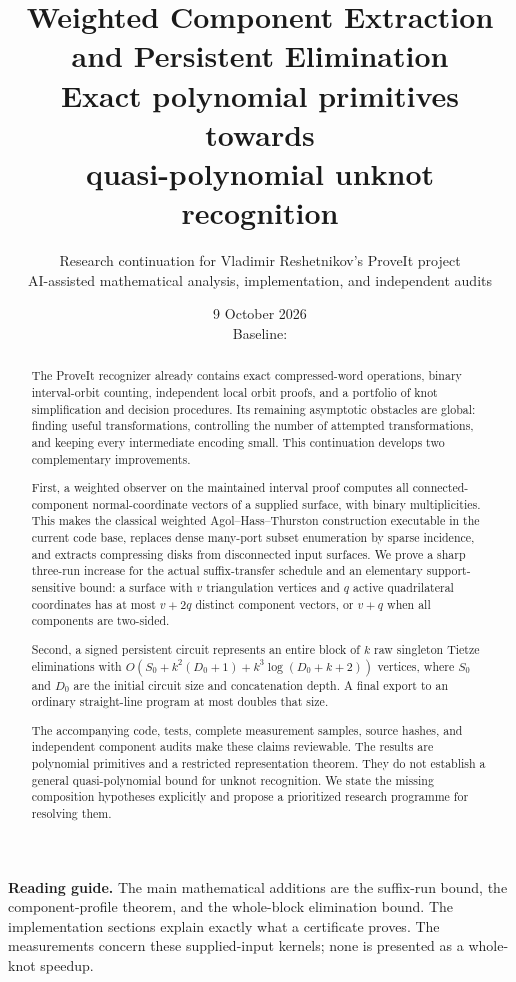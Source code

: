 \documentclass[11pt,a4paper]{article}
\title{\textbf{Weighted Component Extraction\\and Persistent Elimination}\\[0.6em]
  \large Exact polynomial primitives towards\\quasi-polynomial unknot recognition}
\author{Research continuation for Vladimir Reshetnikov's ProveIt project\\
  \small AI-assisted mathematical analysis, implementation, and independent audits}
\date{9 October 2026\\\small Baseline: \commit}
\theoremstyle{definition}
\theoremstyle{remark}
\begin{document}
\maketitle
\thispagestyle{empty}
\begin{abstract}
The ProveIt recognizer already contains exact compressed-word operations,
binary interval-orbit counting, independent local orbit proofs, and a
portfolio of knot simplification and decision procedures. Its remaining
asymptotic obstacles are global: finding useful transformations, controlling
the number of attempted transformations, and keeping every intermediate
encoding small. This continuation develops two complementary improvements.

First, a weighted observer on the maintained interval proof computes all
connected-component normal-coordinate vectors of a supplied surface,
with binary multiplicities. This makes the classical weighted
Agol--Hass--Thurston construction executable in the current code base,
replaces dense many-port subset enumeration by sparse incidence, and
extracts compressing disks from disconnected input surfaces. We prove a
sharp three-run increase for the actual suffix-transfer schedule and an
elementary support-sensitive bound: a surface with $v$ triangulation
vertices and $q$ active quadrilateral coordinates has at most $v+2q$
distinct component vectors, or $v+q$ when all components are two-sided.

Second, a signed persistent circuit represents an entire block of $k$ raw
singleton Tietze eliminations with
$O(S_0+k^2(D_0+1)+k^3\log(D_0+k+2))$ vertices, where $S_0$ and $D_0$
are the initial circuit size and concatenation depth. A final export to
an ordinary straight-line program at most doubles that size.

The accompanying code, tests, complete measurement samples, source hashes,
and independent component audits make these claims reviewable. The results
are polynomial primitives and a restricted representation theorem. They
do not establish a general quasi-polynomial bound for unknot recognition.
We state the missing composition hypotheses explicitly and propose a
prioritized research programme for resolving them.
\end{abstract}

\vfill
\noindent\small\textbf{Reading guide.} The main mathematical additions are the
suffix-run bound, the component-profile theorem, and the whole-block
elimination bound. The implementation sections explain exactly what a
certificate proves. The measurements concern these supplied-input kernels;
none is presented as a whole-knot speedup.
\clearpage
\begingroup
\small
\setlength{\parskip}{0pt}
\tableofcontents
\endgroup
\clearpage
\end{document}
